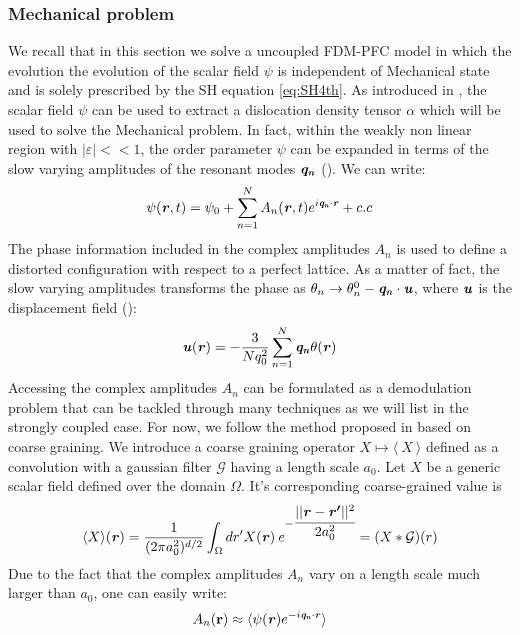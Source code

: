 \documentclass{article}
\begin{document}
\subsubsection{Mechanical problem}
We recall that in this section we solve a uncoupled FDM-PFC model in which the evolution the evolution of the scalar field $\psi$ is independent of Mechanical state and is solely prescribed by the SH equation \cref{eq:SH4th}. As introduced in \cite{upadhyayCouplingPhase2024}, the scalar field $\psi$ can be used to extract a dislocation density tensor $\alpha$ which will be used to solve the Mechanical problem. In fact, within the weakly non linear region with $|\varepsilon|<\!<1$, the order parameter $\psi$ can be expanded in terms of the slow varying amplitudes of the resonant modes $\bm{\mathit{q_n}}$ (\cite{skaugenDislocationdynamics2018}). We can write:
\begin{equation}
   \psi(\bm{\mathit{r}},t) = \psi_0 + \sum_{n=1}^{N} A_n(\bm{\mathit{r}},t) e^{i \bm{\mathit{q_n}}\cdot \bm{\mathit{r}}}+ c.c
\end{equation}
The phase information  included in the complex amplitudes $A_n$ is used to define a distorted configuration with respect to a perfect lattice. As a matter of fact, the slow varying amplitudes transforms the phase as $\theta_n \rightarrow \theta_n^0 -\bm{\mathit{q_n}}\cdot \bm{\mathit{u}}$, where $\bm{\mathit{u}}$ is the displacement field (\cite{skogvollphasefield2022}):
\begin{equation}
   \bm{\mathit{u}}(\bm{\mathit{r}}) = - \frac{3}{Nq_0^2} \sum_{n=1}^{N} \bm{\mathit{q_n}} \theta(\bm{\mathit{r}})
\end{equation}
Accessing the complex amplitudes $A_n$ can be formulated as a demodulation problem that can be tackled through many techniques as we will list in the strongly coupled case. For now, we follow the method proposed in \cite{skogvollphasefield2022} based on coarse graining. We introduce a coarse graining operator $X \longmapsto \langle\: X \: \rangle$ defined as a convolution with a gaussian filter $\mathcal{G}$ having a length scale $a_0$. Let $X$ be a generic scalar field defined over the domain $\Omega$. It's corresponding coarse-grained value is
\begin{equation}
   \langle X\rangle(\bm{\mathit{r}}) =  \frac{1}{(2\pi a_0^2)^{d/2}}\int_\Omega dr' X(\bm{\mathit{r}})  \: e^{-\cfrac{||\bm{\mathit{r}}-\bm{\mathit{r'}}||^2}{2a_0^2}} = (X * \mathcal{G})(r)
\end{equation}
Due to the fact that the complex amplitudes $A_n$ vary on a length scale much larger than $a_0$, one can easily write: 
\begin{equation}
   A_n(\mathbf{r}) \approx \langle \psi(\bm{\mathit{r}}) e^{-i \bm{\mathit{q_n}}\cdot \bm{\mathit{r}}}\rangle
\end{equation}
\end{document}
